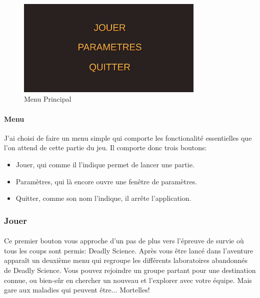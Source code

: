 \documentclass{article}
\begin{document}
\par\vspace{0.5cm}
\begin{figure}[!h]
    \centering
    \includegraphics[width=0.8\textwidth]{MainMenu.png}
    \caption{Menu Principal}
    \label{Main Menu}
\end{figure}{}

\paragraph{Menu}

J'ai choisi de faire un menu simple qui comporte les fonctionalité essentielles que l'on attend de cette partie du jeu. Il comporte donc trois boutons:

\begin{itemize}
    \item Jouer, qui comme il l'indique permet de lancer une partie.
    \item Paramètres, qui là encore ouvre une fenêtre de paramètres.
    \item Quitter, comme son nom l'indique, il arrête l'application.
\end{itemize}

\subsubsection{Jouer}

\paragraph{}
Ce premier bouton vous approche d'un pas de plus vers l'épreuve de survie où tous les coups sont permis: Deadly Science. Après vous être lancé dans l'aventure apparaît un deuxième menu qui regroupe les différents laboratoires abandonnés de Deadly Science. Vous pouvez rejoindre un groupe partant pour une destination connue, ou bien-sûr en chercher un nouveau et l'explorer avec votre équipe. Mais gare aux maladies qui peuvent être... Mortelles!
\end{document}
